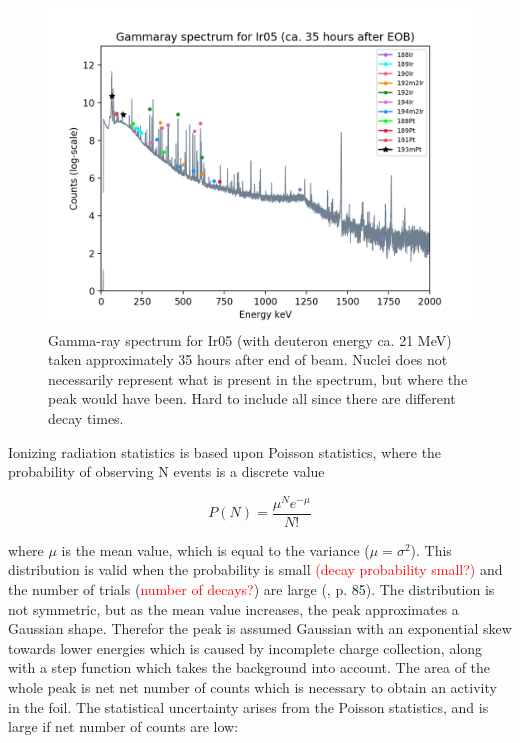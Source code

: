\begin{figure}
    \centering
    \includegraphics{Analysis/gammaray_spec_Ir05.png}
    \caption{Gamma-ray spectrum for Ir05 (with deuteron energy ca. 21 MeV) taken approximately 35 hours after end of beam. Nuclei does not necessarily represent what is present in the spectrum, but where the peak would have been. Hard to include all since there are different decay times.}
    \label{fig:gammarayspectrum_example}
\end{figure}


\noindent 
Ionizing radiation statistics is based upon Poisson statistics, where the probability of observing N events is a discrete value

\begin{equation}
    P(N)=\frac{\mu^N e^{-\mu}}{N!}
\end{equation}

where $\mu$ is the mean value, which is equal to the variance ($\mu=\sigma^2$). This distribution is valid when the probability is small \textcolor{red}{(decay probability small?)} and the number of trials (\textcolor{red}{number of decays?}) are large (\cite{Leo1994}, p. 85).  The distribution is not symmetric, but as the mean value increases, the peak approximates a Gaussian shape. Therefor the peak is assumed Gaussian with an exponential skew towards lower energies which is caused by incomplete charge collection, along with a step function which takes the background into account. The area of the whole peak is net net number of counts which is necessary to obtain an activity in the foil. The statistical uncertainty arises from the Poisson statistics, and is large if net number of counts are low:

